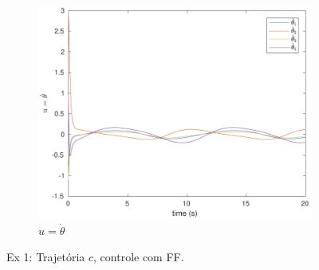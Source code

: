 \documentclass[a4paper,11pt]{article}
\theoremstyle{mytheor}
\begin{document}
\begin{figure}[!ht]
\begin{minipage}{\linewidth}
    \begin{subfigure}[b]{0.45\textwidth}
    \includegraphics[width=1\textwidth]{figs/ex1_c_1_dq.pdf}
    \caption{$u = \dot{\theta}$}
    \label{fig:ex1_c_1_dq}
    \end{subfigure}
  \end{minipage}
\caption{Ex 1: Trajetória $c$, controle com FF.}
\label{fig:ex1_c_1}
\end{figure}
\end{document}
